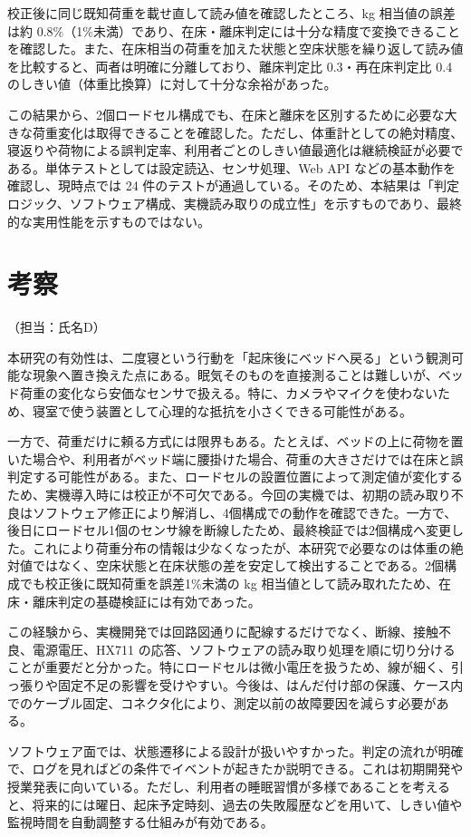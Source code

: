 \documentclass[paper=a4,fontsize=10pt,ja=standard,lualatex]{jlreq}
\newcommand{\AuthorNote}[1]{\hfill{\small （担当：#1）}}
\begin{document}
校正後に同じ既知荷重を載せ直して読み値を確認したところ、kg 相当値の誤差は約 0.8\%（1\%未満）であり、在床・離床判定には十分な精度で変換できることを確認した。また、在床相当の荷重を加えた状態と空床状態を繰り返して読み値を比較すると、両者は明確に分離しており、離床判定比 0.3・再在床判定比 0.4 のしきい値（体重比換算）に対して十分な余裕があった。

この結果から、2個ロードセル構成でも、在床と離床を区別するために必要な大きな荷重変化は取得できることを確認した。ただし、体重計としての絶対精度、寝返りや荷物による誤判定率、利用者ごとのしきい値最適化は継続検証が必要である。単体テストとしては設定読込、センサ処理、Web API などの基本動作を確認し、現時点では 24 件のテストが通過している。そのため、本結果は「判定ロジック、ソフトウェア構成、実機読み取りの成立性」を示すものであり、最終的な実用性能を示すものではない。

\section{考察}
\label{sec:discussion}
\AuthorNote{氏名D}

本研究の有効性は、二度寝という行動を「起床後にベッドへ戻る」という観測可能な現象へ置き換えた点にある。眠気そのものを直接測ることは難しいが、ベッド荷重の変化なら安価なセンサで扱える。特に、カメラやマイクを使わないため、寝室で使う装置として心理的な抵抗を小さくできる可能性がある。

一方で、荷重だけに頼る方式には限界もある。たとえば、ベッドの上に荷物を置いた場合や、利用者がベッド端に腰掛けた場合、荷重の大きさだけでは在床と誤判定する可能性がある。また、ロードセルの設置位置によって測定値が変化するため、実機導入時には校正が不可欠である。今回の実機では、初期の読み取り不良はソフトウェア修正により解消し、4個構成での動作を確認できた。一方で、後日にロードセル1個のセンサ線を断線したため、最終検証では2個構成へ変更した。これにより荷重分布の情報は少なくなったが、本研究で必要なのは体重の絶対値ではなく、空床状態と在床状態の差を安定して検出することである。2個構成でも校正後に既知荷重を誤差1\%未満の kg 相当値として読み取れたため、在床・離床判定の基礎検証には有効であった。

この経験から、実機開発では回路図通りに配線するだけでなく、断線、接触不良、電源電圧、HX711 の応答、ソフトウェアの読み取り処理を順に切り分けることが重要だと分かった。特にロードセルは微小電圧を扱うため、線が細く、引っ張りや固定不足の影響を受けやすい。今後は、はんだ付け部の保護、ケース内でのケーブル固定、コネクタ化により、測定以前の故障要因を減らす必要がある。

ソフトウェア面では、状態遷移による設計が扱いやすかった。判定の流れが明確で、ログを見ればどの条件でイベントが起きたか説明できる。これは初期開発や授業発表に向いている。ただし、利用者の睡眠習慣が多様であることを考えると、将来的には曜日、起床予定時刻、過去の失敗履歴などを用いて、しきい値や監視時間を自動調整する仕組みが有効である。
\end{document}
